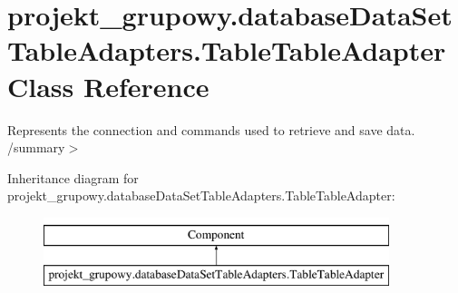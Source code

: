 \hypertarget{classprojekt__grupowy_1_1database_data_set_table_adapters_1_1_table_table_adapter}{}\section{projekt\+\_\+grupowy.\+database\+Data\+Set\+Table\+Adapters.\+Table\+Table\+Adapter Class Reference}
\label{classprojekt__grupowy_1_1database_data_set_table_adapters_1_1_table_table_adapter}


Represents the connection and commands used to retrieve and save data. /summary$>$  


Inheritance diagram for projekt\+\_\+grupowy.\+database\+Data\+Set\+Table\+Adapters.\+Table\+Table\+Adapter\+:\begin{figure}[H]
\begin{center}
\leavevmode
\includegraphics[height=2.000000cm]{classprojekt__grupowy_1_1database_data_set_table_adapters_1_1_table_table_adapter}
\end{center}
\end{figure}
